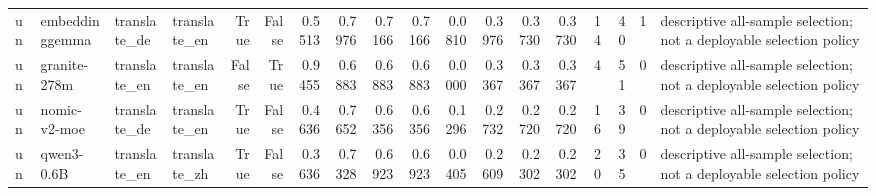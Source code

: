 \begin{tabular}{llllrrrrrrrrrrrrrl}
un & embeddinggemma & translate\_de & translate\_en & True & False & 0.5513 & 0.7976 & 0.7166 & 0.7166 & 0.0810 & 0.3976 & 0.3730 & 0.3730 & 14 & 40 & 1 & descriptive all-sample selection; not a deployable selection policy \\
un & granite-278m & translate\_en & translate\_en & False & True & 0.9455 & 0.6883 & 0.6883 & 0.6883 & 0.0000 & 0.3367 & 0.3367 & 0.3367 & 4 & 51 & 0 & descriptive all-sample selection; not a deployable selection policy \\
un & nomic-v2-moe & translate\_de & translate\_en & True & False & 0.4636 & 0.7652 & 0.6356 & 0.6356 & 0.1296 & 0.2732 & 0.2720 & 0.2720 & 16 & 39 & 0 & descriptive all-sample selection; not a deployable selection policy \\
un & qwen3-0.6B & translate\_en & translate\_zh & True & False & 0.3636 & 0.7328 & 0.6923 & 0.6923 & 0.0405 & 0.2609 & 0.2302 & 0.2302 & 20 & 35 & 0 & descriptive all-sample selection; not a deployable selection policy \\
\bottomrule
\end{tabular}
